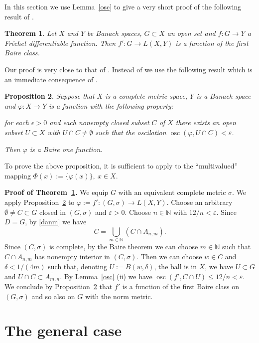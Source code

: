 \documentclass[12pt,a4paper]{amsart}
\theoremstyle{plain}
\newtheorem{theorem}{Theorem}[section]   %
\newtheorem{proposition}[theorem]{Proposition}  %
\theoremstyle{definition}
\theoremstyle{remark}
\numberwithin{equation}{section}
\newcommand{\N}{{\mathbb N}}
\newcommand{\osc}{\operatorname{osc}}
\newcommand{\ep}{\varepsilon}
\begin{document}
In this section we use Lemma~\ref{osc} to give a very short proof of the following  result
 of \cite{MS}.
\begin{theorem}\label{MS} \cite[Theorem 1]{MS}
Let $X$ and $Y$ be Banach spaces, $G \subset X$ an open set and $f: G \to Y$ a Fréchet differentiable function.
 Then $f':G \to L(X,Y)$ is a function of the first Baire class.
\end{theorem}
Our proof is very close to that of \cite{MS}. Instead of 
\cite[Theorem 4, $(ii) \Rightarrow (i)$]{S} we use the following result which is an immediate consequence
 of \cite[Theorem 3]{S}.
\begin{proposition}\label{S}\cite{S}
Suppose that $X$ is a complete metric space, $Y$ is a Banach space
and $\varphi : X \to  Y$ is a function with the following property:

for each $\epsilon > 0$ and each nonempty  closed subset $C$ of $X$   there exists an open subset $U \subset  X$ with $U\cap C\neq \emptyset$  such that the oscilation $\osc(\varphi, U\cap C)<\ep$.

Then $\varphi$ is a Baire one function.
 \end{proposition}
To prove the above proposition, it is sufficient to apply   \cite[Theorem 3]{S} to the ``multivalued'' mapping
 $\Phi(x):= \{\varphi(x)\},\ x \in X$.
 \vspace{3mm}

{\bf Proof of Theorem~\ref{MS}.}
We equip   $G$ with an equivalent complete metric $\sigma$. We  apply Proposition~\ref{S}  to
 $\varphi:= f':(G,\sigma) \to L(X,Y)$. Choose an  arbitrary $\emptyset \neq C \subset G$ closed in
 $(G,\sigma)$ and $\ep>0$. Choose $n \in \N$ with $12/n < \ep$. Since $D=G$, by \eqref{danm} we have  
$$  C= \bigcup_{m\in \N} (C \cap A_{n,m}).$$
Since $(C,\sigma)$ is complete, by the Baire theorem we can choose $m\in \N$ such that
$C \cap \overline{A_{n,m}}$ has nonempty interior in $(C,\sigma)$. Then we can choose
 $w \in C$ and $\delta< 1/(4m)$ such that, denoting $U:= B(w,\delta)$, the ball is in $X$, we have
 $U\subset G$ and $U\cap C \subset  \overline{A_{m,n}}$. By Lemma~\ref{osc} (ii) we have
 $\osc(f', C \cap U)  \leq 12/n < \ep$. We conclude by    Proposition~\ref{S} that $f'$ 
 is a function of the first Baire class on $(G,\sigma)$ and so also on $G$ with the norm metric. 


\section{The general case}
\end{document}
